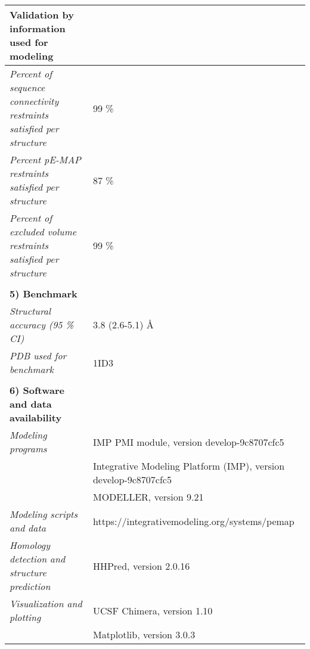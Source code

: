 \documentclass[8pt,a4paper]{article}
\begin{document}
\begin{longtable}{ p{} | p{} }
  \textbf{Validation by information used for modeling} & \\
  \hline
          \textit{Percent of sequence connectivity restraints satisfied per structure} & 99 \%\\
                \textit{Percent pE-MAP restraints satisfied per structure} & 87 \%\\
                \textit{Percent of excluded volume restraints satisfied per structure} & 99 \%\\
          &  \\
  
  \textbf{5) Benchmark} & \\
  \hline
          \textit{Structural accuracy (95 \% CI)} & 3.8 (2.6-5.1) \AA\\
                \textit{PDB used for benchmark} & 1ID3\\
          
   &  \\
  \normalsize{\textbf{6) Software and data availability}} & \\
    \hline
             \textit{Modeling programs} & IMP PMI module, version develop-9c8707cfc5\\
             & Integrative Modeling Platform (IMP), version develop-9c8707cfc5 \\
             & MODELLER, version 9.21 \\
                  \textit{Modeling scripts and data} & https://integrativemodeling.org/systems/pemap\\
                  \textit{Homology detection and structure prediction} & HHPred, version 2.0.16\\
                  \textit{Visualization and plotting} & UCSF Chimera, version 1.10\\
             & Matplotlib, version 3.0.3  \\
          \hline

  
\end{longtable}
\end{document}
